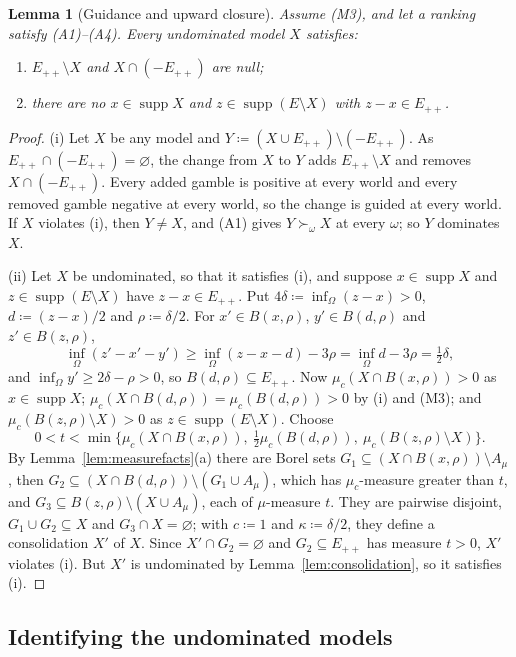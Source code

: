 \documentclass[11pt]{article}
\newtheorem{lemma}[theorem]{Lemma}
\theoremstyle{definition}
\newcommand{\Epp}{E_{++}}
\DeclareMathOperator{\supp}{supp}
\begin{document}
\begin{lemma}[Guidance and upward closure]\label{lem:necessary}
Assume (M3), and let a ranking satisfy (A1)--(A4). Every undominated model $X$ satisfies:
\begin{enumerate}[label=(\roman*)]
\item $\Epp\setminus X$ and $X\cap(-\Epp)$ are null;
\item there are no $x\in\supp X$ and $z\in\supp(E\setminus X)$ with $z-x\in\Epp$.
\end{enumerate}
\end{lemma}
\begin{proof}
(i) Let $X$ be any model and $Y\coloneqq(X\cup\Epp)\setminus(-\Epp)$. As $\Epp\cap(-\Epp)=\varnothing$, the change from $X$ to $Y$ adds $\Epp\setminus X$ and removes $X\cap(-\Epp)$. Every added gamble is positive at every world and every removed gamble negative at every world, so the change is guided at every world. If $X$ violates (i), then $Y\ne X$, and (A1) gives $Y\succ_\omega X$ at every $\omega$; so $Y$ dominates $X$.

(ii) Let $X$ be undominated, so that it satisfies (i), and suppose $x\in\supp X$ and $z\in\supp(E\setminus X)$ have $z-x\in\Epp$. Put $4\delta\coloneqq\inf_\Omega(z-x)>0$, $d\coloneqq(z-x)/2$ and $\rho\coloneqq\delta/2$. For $x'\in B(x,\rho)$, $y'\in B(d,\rho)$ and $z'\in B(z,\rho)$,
\[
\inf_\Omega(z'-x'-y')\ge\inf_\Omega(z-x-d)-3\rho=\inf_\Omega d-3\rho=\tfrac12\delta,
\]
and $\inf_\Omega y'\ge2\delta-\rho>0$, so $B(d,\rho)\subseteq\Epp$. Now $\mu_c(X\cap B(x,\rho))>0$ as $x\in\supp X$; $\mu_c(X\cap B(d,\rho))=\mu_c(B(d,\rho))>0$ by (i) and (M3); and $\mu_c(B(z,\rho)\setminus X)>0$ as $z\in\supp(E\setminus X)$. Choose
\[
0<t<\min\bigl\{\mu_c(X\cap B(x,\rho)),\ \tfrac12\mu_c(B(d,\rho)),\ \mu_c(B(z,\rho)\setminus X)\bigr\}.
\]
By Lemma~\ref{lem:measurefacts}(a) there are Borel sets $G_1\subseteq(X\cap B(x,\rho))\setminus A_\mu$, then $G_2\subseteq(X\cap B(d,\rho))\setminus(G_1\cup A_\mu)$, which has $\mu_c$-measure greater than $t$, and $G_3\subseteq B(z,\rho)\setminus(X\cup A_\mu)$, each of $\mu$-measure $t$. They are pairwise disjoint, $G_1\cup G_2\subseteq X$ and $G_3\cap X=\varnothing$; with $c\coloneqq1$ and $\kappa\coloneqq\delta/2$, they define a consolidation $X'$ of $X$. Since $X'\cap G_2=\varnothing$ and $G_2\subseteq\Epp$ has measure $t>0$, $X'$ violates (i). But $X'$ is undominated by Lemma~\ref{lem:consolidation}, so it satisfies (i).
\end{proof}

\subsection{Identifying the undominated models}
\end{document}
